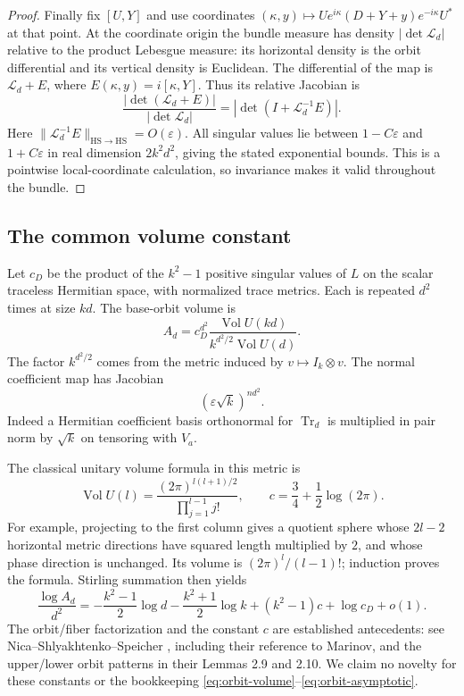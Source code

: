 \documentclass[11pt]{article}
\theoremstyle{definition}\newtheorem{definition}[theorem]{Definition}
\theoremstyle{remark}\newtheorem{remark}[theorem]{Remark}
\DeclareMathOperator{\Tr}{Tr}\DeclareMathOperator{\tr}{tr}
\DeclareMathOperator{\Vol}{Vol}\DeclareMathOperator{\rank}{rank}
\newcommand{\eps}{\varepsilon}\newcommand{\id}{\mathrm{id}}
\newcommand{\HS}{\mathrm{HS}}\newcommand{\op}{\mathrm{op}}
\begin{document}
\begin{proof}
Finally fix $[U,Y]$ and use coordinates
$(\kappa,y)\mapsto Ue^{i\kappa}(D+Y+y)e^{-i\kappa}U^*$ at that point.
At the coordinate origin the bundle measure has density
$|\det\mathcal L_d|$ relative to the product Lebesgue measure: its
horizontal density is the orbit differential and its vertical density
is Euclidean. The differential of the map is $\mathcal L_d+E$, where
$E(\kappa,y)=i[\kappa,Y]$. Thus its relative Jacobian is
\[
 \frac{|\det(\mathcal L_d+E)|}{|\det\mathcal L_d|}
 =|\det(I+\mathcal L_d^{-1}E)|.
\]
Here $\|\mathcal L_d^{-1}E\|_{\HS\to\HS}=O(\eps)$.
All singular values lie between $1-C\eps$ and $1+C\eps$ in real
dimension $2k^2d^2$, giving the stated exponential bounds. This is a
pointwise local-coordinate calculation, so invariance makes it valid
throughout the bundle.
\end{proof}

\subsection{The common volume constant}
Let $c_D$ be the product of the $k^2-1$ positive singular values of $L$
on the scalar traceless Hermitian space, with normalized trace metrics.
Each is repeated $d^2$ times at size $kd$. The base-orbit volume is
\begin{equation}\label{eq:orbit-volume}
 A_d=c_D^{d^2}\frac{\Vol U(kd)}{k^{d^2/2}\Vol U(d)}.
\end{equation}
The factor $k^{d^2/2}$ comes from the metric induced by
$v\mapsto I_k\otimes v$. The normal coefficient map has Jacobian
\begin{equation}\label{eq:fiber-jac}
 (\eps\sqrt k)^{nd^2}.
\end{equation}
Indeed a Hermitian coefficient basis orthonormal for $\Tr_d$ is
multiplied in pair norm by $\sqrt k$ on tensoring with $V_a$.

The classical unitary volume formula in this metric is
\begin{equation}\label{eq:unitary-volume}
 \Vol U(l)=\frac{(2\pi)^{l(l+1)/2}}{\prod_{j=1}^{l-1}j!},\qquad
 c=\frac34+\frac12\log(2\pi).
\end{equation}
For example, projecting to the first column gives a quotient sphere
whose $2l-2$ horizontal metric directions have squared length multiplied
by $2$, and whose phase direction is unchanged. Its volume is
$(2\pi)^l/(l-1)!$; induction proves the formula. Stirling summation
then yields
\begin{equation}\label{eq:orbit-asymptotic}
 \frac{\log A_d}{d^2}
 =-\frac{k^2-1}{2}\log d-\frac{k^2+1}{2}\log k
 +(k^2-1)c+\log c_D+o(1).
\end{equation}
The orbit/fiber factorization and the constant $c$ are established
antecedents: see Nica--Shlyakhtenko--Speicher
\cite[Lemmas 2.6 and 2.8]{NSSentropy}, including their reference to
Marinov, and the upper/lower orbit patterns in their Lemmas 2.9 and
2.10. We claim no novelty for these constants or the bookkeeping
\eqref{eq:orbit-volume}--\eqref{eq:orbit-asymptotic}.
\end{document}

